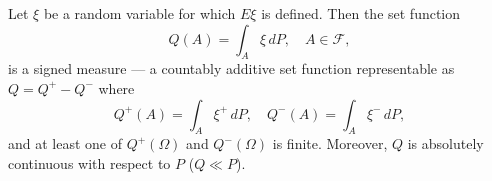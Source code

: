 Let $\xi$ be a random variable for which $E\xi$ is defined. Then the set function
$$Q(A) = \int_A \xi \, dP, \quad A \in \mathcal{F},$$
is a signed measure --- a countably additive set function representable as $Q = Q^+ - Q^-$ where
$$Q^+(A) = \int_A \xi^+ \, dP, \quad Q^-(A) = \int_A \xi^- \, dP,$$
and at least one of $Q^+(\Omega)$ and $Q^-(\Omega)$ is finite. Moreover, $Q$ is absolutely continuous with respect to $P$ ($Q \ll P$).
